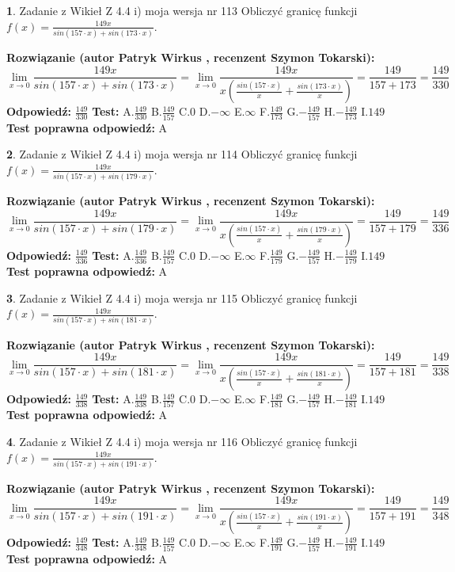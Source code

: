 \documentclass[12pt, a4paper]{article}
\theoremstyle{definition} %
\newtheorem{zad}{}
\newcommand{\zadStart}[1]{\begin{zad}#1\newline}
\newcommand{\zadStop}{\end{zad}}
\newcommand{\rozwStart}[2]{\noindent \textbf{Rozwiązanie (autor #1 , recenzent #2): }\newline}
\newcommand{\rozwStop}{\newline}
\newcommand{\odpStart}{\noindent \textbf{Odpowiedź:}\newline}
\newcommand{\odpStop}{\newline}
\newcommand{\testStart}{\noindent \textbf{Test:}\newline}
\newcommand{\testStop}{\newline}
\newcommand{\kluczStart}{\noindent \textbf{Test poprawna odpowiedź:}\newline}
\newcommand{\kluczStop}{\newline}
\begin{document}
\zadStart{Zadanie z Wikieł Z 4.4 i) moja wersja nr 113}
Obliczyć granicę funkcji $f(x)=\frac{149x}{sin(157\cdot x) +sin(173\cdot x)}$.
\zadStop
\rozwStart{Patryk Wirkus}{Szymon Tokarski}
$$\lim\limits_{x\to 0}\frac{149x}{sin(157\cdot x) +sin(173\cdot x)}=\lim\limits_{x\to 0}\frac{149x}{x(\frac{sin(157\cdot x)}{x}+\frac{sin(173\cdot x)}{x})}=\frac{149}{157+173} = \frac{149}{330}$$
\rozwStop
\odpStart
$\frac{149}{330}$
\odpStop
\testStart
A.$\frac{149}{330}$
B.$\frac{149}{157}$
C.$0$
D.$-\infty$
E.$\infty$
F.$\frac{149}{173}$
G.$-\frac{149}{157}$
H.$-\frac{149}{173}$
I.$149$
\testStop
\kluczStart
A
\kluczStop



\zadStart{Zadanie z Wikieł Z 4.4 i) moja wersja nr 114}
Obliczyć granicę funkcji $f(x)=\frac{149x}{sin(157\cdot x) +sin(179\cdot x)}$.
\zadStop
\rozwStart{Patryk Wirkus}{Szymon Tokarski}
$$\lim\limits_{x\to 0}\frac{149x}{sin(157\cdot x) +sin(179\cdot x)}=\lim\limits_{x\to 0}\frac{149x}{x(\frac{sin(157\cdot x)}{x}+\frac{sin(179\cdot x)}{x})}=\frac{149}{157+179} = \frac{149}{336}$$
\rozwStop
\odpStart
$\frac{149}{336}$
\odpStop
\testStart
A.$\frac{149}{336}$
B.$\frac{149}{157}$
C.$0$
D.$-\infty$
E.$\infty$
F.$\frac{149}{179}$
G.$-\frac{149}{157}$
H.$-\frac{149}{179}$
I.$149$
\testStop
\kluczStart
A
\kluczStop



\zadStart{Zadanie z Wikieł Z 4.4 i) moja wersja nr 115}
Obliczyć granicę funkcji $f(x)=\frac{149x}{sin(157\cdot x) +sin(181\cdot x)}$.
\zadStop
\rozwStart{Patryk Wirkus}{Szymon Tokarski}
$$\lim\limits_{x\to 0}\frac{149x}{sin(157\cdot x) +sin(181\cdot x)}=\lim\limits_{x\to 0}\frac{149x}{x(\frac{sin(157\cdot x)}{x}+\frac{sin(181\cdot x)}{x})}=\frac{149}{157+181} = \frac{149}{338}$$
\rozwStop
\odpStart
$\frac{149}{338}$
\odpStop
\testStart
A.$\frac{149}{338}$
B.$\frac{149}{157}$
C.$0$
D.$-\infty$
E.$\infty$
F.$\frac{149}{181}$
G.$-\frac{149}{157}$
H.$-\frac{149}{181}$
I.$149$
\testStop
\kluczStart
A
\kluczStop



\zadStart{Zadanie z Wikieł Z 4.4 i) moja wersja nr 116}
Obliczyć granicę funkcji $f(x)=\frac{149x}{sin(157\cdot x) +sin(191\cdot x)}$.
\zadStop
\rozwStart{Patryk Wirkus}{Szymon Tokarski}
$$\lim\limits_{x\to 0}\frac{149x}{sin(157\cdot x) +sin(191\cdot x)}=\lim\limits_{x\to 0}\frac{149x}{x(\frac{sin(157\cdot x)}{x}+\frac{sin(191\cdot x)}{x})}=\frac{149}{157+191} = \frac{149}{348}$$
\rozwStop
\odpStart
$\frac{149}{348}$
\odpStop
\testStart
A.$\frac{149}{348}$
B.$\frac{149}{157}$
C.$0$
D.$-\infty$
E.$\infty$
F.$\frac{149}{191}$
G.$-\frac{149}{157}$
H.$-\frac{149}{191}$
I.$149$
\testStop
\kluczStart
A
\kluczStop
\end{document}
